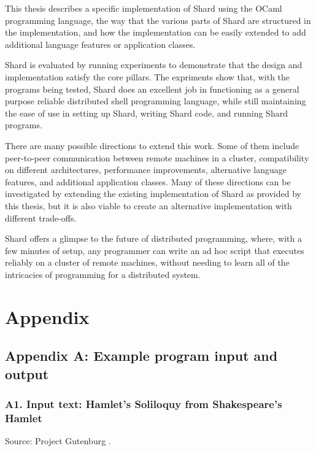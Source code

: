 \documentclass[twoside]{report}
\begin{document}
This thesis describes a specific implementation of Shard using the OCaml programming language, the way that the various parts of Shard are structured in the implementation, and how the implementation can be easily extended to add additional language features or application classes.

Shard is evaluated by running experiments to demonstrate that the design and implementation satisfy the core pillars. The expriments show that, with the programs being tested, Shard does an excellent job in functioning as a general purpose reliable distributed shell programming language, while still maintaining the ease of use in setting up Shard, writing Shard code, and running Shard programs.

There are many possible directions to extend this work.
Some of them include peer-to-peer communication between remote machines in a cluster, compatibility on different architectures, performance improvements, alternative language features, and additional application classes.
Many of these directions can be investigated by extending the existing implementation of Shard as provided by this thesis, but it is also viable to create an alternative implementation with different trade-offs.

Shard offers a glimpse to the future of distributed programming, where, with a few minutes of setup, any programmer can write an ad hoc script that executes reliably on a cluster of remote machines, without needing to learn all of the intricacies of programming for a distributed system.


\chapter{Appendix}
\section{Appendix A: Example program input and output}

\subsection{A1. Input text: Hamlet's Soliloquy from Shakespeare's Hamlet}

Source: Project Gutenburg \cite{hamlet}.
\end{document}
